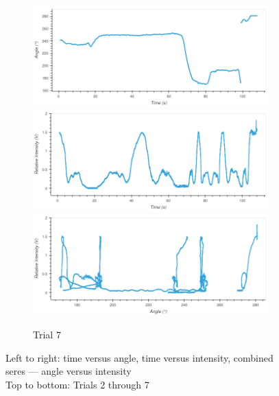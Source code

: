 \begin{figure}
\begin{subfigure}{1.0\textwidth}
\caption*{Trial 7}
\includegraphics[width=\plotwidth]{plots/t8-time-angle.png}
\includegraphics[width=\plotwidth]{plots/t8-time-intensity.png}
\includegraphics[width=\plotwidth]{plots/t8-angle-intensity.png}
\end{subfigure}

\caption{
Left to right: time versus angle, time versus intensity, combined seres — angle versus intensity\\
Top to bottom: Trials 2 through 7
}
\end{figure}
